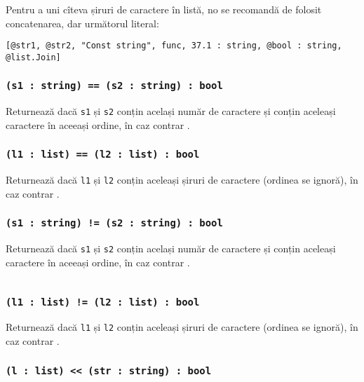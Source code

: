Pentru a uni cîteva șiruri de caractere în listă, no se recomandă de folosit concatenarea, dar următorul literal:
\begin{verbatim}
[@str1, @str2, "Const string", func, 37.1 : string, @bool : string, @list.Join]
\end{verbatim}

\subsubsection{\texttt{(s1 : string) == (s2 : string) : bool}}

Returnează \true{} dacă \texttt{s1} și \texttt{s2} conțin același număr de caractere și conțin aceleași caractere în aceeași ordine, în caz contrar \false{}.

\subsubsection{\texttt{(l1 : list) == (l2 : list) : bool}}

Returnează \true{} dacă \texttt{l1} și \texttt{l2} conțin aceleași șiruri de caractere (ordinea se ignoră), în caz contrar \false{}.

\subsubsection{\texttt{(s1 : string) != (s2 : string) : bool}}

Returnează \false{} dacă \texttt{s1} și \texttt{s2} conțin același număr de caractere și conțin aceleași caractere în aceeași ordine, în caz contrar \true{}.

\begin{sourcecode}
\label{stringlistopex}
\inputminted[linenos]{icl}{../sources/stringlistopex.icL}
\end{sourcecode}

\subsubsection{\texttt{(l1 : list) != (l2 : list) : bool}}

Returnează \false{} dacă \texttt{l1} și \texttt{l2} conțin aceleași șiruri de caractere (ordinea se ignoră), în caz contrar \true{}.

\subsubsection{\texttt{(l : list) << (str : string) : bool}}

